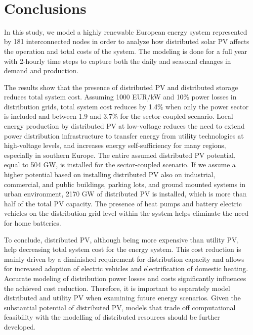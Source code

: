 \documentclass[review]{elsarticle}
\begin{document}
\vspace{\baselineskip}
\


\section{Conclusions}

In this study, we model a highly renewable European energy system represented by 181 interconnected nodes in order to analyze how distributed solar PV affects the operation and total costs of the system. The modeling is done for a full year with 2-hourly time steps to capture both the daily and seasonal changes in demand and production. 

The results show that the presence of distributed PV and distributed storage reduces total system cost. Assuming 1000 EUR/kW and 10\% power losses in distribution grids, total system cost reduces by 1.4\% when only the power sector is included and between 1.9 and 3.7\% for the sector-coupled scenario. Local energy production by distributed PV at low-voltage reduces the need to extend power distribution infrastructure to transfer energy from utility technologies at high-voltage levels, and increases energy self-sufficiency for many regions, especially in southern Europe. The entire assumed distributed PV potential, equal to 504 GW, is installed for the sector-coupled scenario. If we assume a higher potential based on installing distributed PV also on industrial, commercial, and public buildings, parking lots, and ground mounted systems in urban environment, 2170 GW of distributed PV is installed, which is more than half of the total PV capacity. The presence of heat pumps and battery electric vehicles on the distribution grid level within the system helps eliminate the need for home batteries. 

To conclude, distributed PV, although being more expensive than utility PV, help decreasing total system cost for the energy system. This cost reduction is mainly driven by a diminished requirement for distribution capacity and allows for increased adoption of electric vehicles and electrification of domestic heating. Accurate modeling of distribution power losses and costs significantly influences the achieved cost reduction. Therefore, it is important to separately model distributed and utility PV when examining future energy scenarios. Given the substantial potential of distributed PV, models that trade off computational feasibility with the modelling of distributed resources should be further developed.
\end{document}

